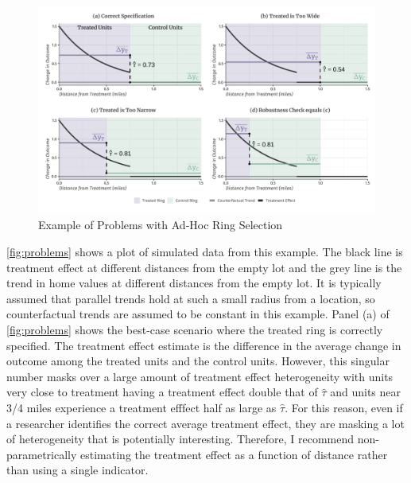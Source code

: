 \documentclass[10pt]{article}
\begin{document}

\begin{figure}[tb]
    \caption{Example of Problems with Ad-Hoc Ring Selection}
    \label{fig:problems}
    
    \begin{adjustbox}{width = 1.1\textwidth, center}
        \includegraphics[width=\textwidth]{../figures/example.pdf}
    \end{adjustbox}
\end{figure}

\autoref{fig:problems} shows a plot of simulated data from this example. The black line is treatment effect at different distances from the empty lot and the grey line is the trend in home values at different distances from the empty lot. It is typically assumed that parallel trends hold at such a small radius from a location, so counterfactual trends are assumed to be constant in this example. Panel (a) of \autoref{fig:problems} shows the best-case scenario where the treated ring is correctly specified. The treatment effect estimate is the difference in the average change in outcome among the treated units and the control units. However, this singular number masks over a large amount of treatment effect heterogeneity with units very close to treatment having a treatment effect double that of $\hat{\tau}$ and units near 3/4 miles experience a treatment efffect half as large as $\hat{\tau}$. For this reason, even if a researcher identifies the correct average treatment effect, they are masking a lot of heterogeneity that is potentially interesting. Therefore, I recommend non-parametrically estimating the treatment effect as a function of distance rather than using a single indicator. 
\end{document}
